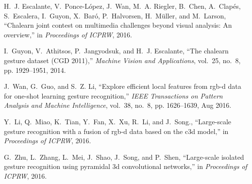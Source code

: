 \documentclass[10pt, a4paper, conference]{IEEEtran}
\begin{document}
\begin{thebibliography}{10}
H.~J. Escalante, V.~Ponce-López, J.~Wan, M.~A. Riegler, B.~Chen, A.~Clapés,
  S.~Escalera, I.~Guyon, X.~Baró, P.~Halvorsen, H.~Müller, and M.~Larson,
  ``Chalearn joint contest on multimedia challenges beyond visual analysis: An
  overview,'' in \emph{Proceedings of ICPRW}, 2016.

I.~Guyon, V.~Athitsos, P.~Jangyodsuk, and H.~J. Escalante, ``The chalearn
  gesture dataset ({CGD} 2011),'' \emph{Machine Vision and Applications},
  vol.~25, no.~8, pp. 1929--1951, 2014.

J.~Wan, G.~Guo, and S.~Z. Li, ``Explore efficient local features from rgb-d
  data for one-shot learning gesture recognition,'' \emph{IEEE Transactions on
  Pattern Analysis and Machine Intelligence}, vol.~38, no.~8, pp. 1626--1639,
  Aug 2016.

Y.~Li, Q.~Miao, K.~Tian, Y.~Fan, X.~Xu, R.~Li, and J.~Song., ``Large-scale
  gesture recognition with a fusion of rgb-d data based on the c3d model,'' in
  \emph{Proceedings of ICPRW}, 2016.

G.~Zhu, L.~Zhang, L.~Mei, J.~Shao, J.~Song, and P.~Shen, ``Large-scale isolated
  gesture recognition using pyramidal 3d convolutional networks,'' in
  \emph{Proceedings of ICPRW}, 2016.

\end{thebibliography}
\end{document}
